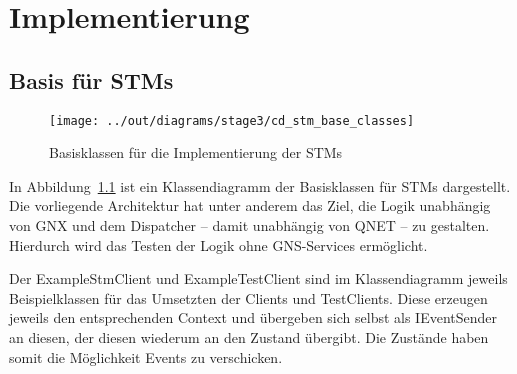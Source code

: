 \chapter{Implementierung}\label{ch:implementierung}


\section{Basis für STMs}\label{sec:basis-fuer-stms}

\begin{figure}[h]
    \centering
    \texttt{[image: ../out/diagrams/stage3/cd\_stm\_base\_classes]}
    \caption{Basisklassen für die Implementierung der STMs}
    \label{fig:cd-stm-base}
\end{figure}

In Abbildung~\ref{fig:cd-stm-base} ist ein Klassendiagramm der Basisklassen für STMs dargestellt.
Die vorliegende Architektur hat unter anderem das Ziel, die Logik unabhängig von GNX und
dem Dispatcher – damit unabhängig von QNET – zu gestalten.
Hierdurch wird das Testen der Logik ohne GNS-Services ermöglicht.

Der ExampleStmClient und ExampleTestClient sind im Klassendiagramm jeweils Beispielklassen für
das Umsetzten der Clients und TestClients.
Diese erzeugen jeweils den entsprechenden Context und übergeben sich selbst als IEventSender an diesen,
der diesen wiederum an den Zustand übergibt.
Die Zustände haben somit die Möglichkeit Events zu verschicken.



